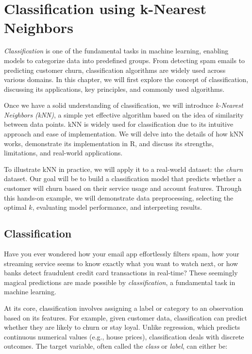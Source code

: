 \documentclass[
]{book}
\theoremstyle{definition}
\theoremstyle{definition}
\theoremstyle{definition}
\theoremstyle{definition}
\theoremstyle{remark}
\begin{document}
\chapter{Classification using k-Nearest Neighbors}\label{chapter-knn}

\emph{Classification} is one of the fundamental tasks in machine learning, enabling models to categorize data into predefined groups. From detecting spam emails to predicting customer churn, classification algorithms are widely used across various domains. In this chapter, we will first explore the concept of classification, discussing its applications, key principles, and commonly used algorithms.

Once we have a solid understanding of classification, we will introduce \emph{k-Nearest Neighbors (kNN)}, a simple yet effective algorithm based on the idea of similarity between data points. kNN is widely used for classification due to its intuitive approach and ease of implementation. We will delve into the details of how kNN works, demonstrate its implementation in R, and discuss its strengths, limitations, and real-world applications.

To illustrate kNN in practice, we will apply it to a real-world dataset: the \emph{churn} dataset. Our goal will be to build a classification model that predicts whether a customer will churn based on their service usage and account features. Through this hands-on example, we will demonstrate data preprocessing, selecting the optimal \(k\), evaluating model performance, and interpreting results.

\section{Classification}\label{classification}

Have you ever wondered how your email app effortlessly filters spam, how your streaming service seems to know exactly what you want to watch next, or how banks detect fraudulent credit card transactions in real-time? These seemingly magical predictions are made possible by \emph{classification}, a fundamental task in machine learning.

At its core, classification involves assigning a label or category to an observation based on its features. For example, given customer data, classification can predict whether they are likely to churn or stay loyal. Unlike regression, which predicts continuous numerical values (e.g., house prices), classification deals with discrete outcomes. The target variable, often called the \emph{class} or \emph{label}, can either be:
\end{document}
